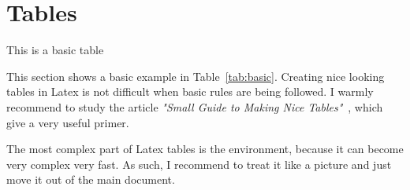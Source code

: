 \section{Tables}

\begin{table}
\centering
\caption{This is a basic table}
\label{tab:basic}

\end{table}

This section shows a basic example in Table~\ref{tab:basic}.
Creating nice looking tables in Latex is not difficult when basic rules are being followed.
I warmly recommend to study the article \emph{"Small Guide to Making Nice Tables"}~\cite{Pue08}, which give a very useful primer.

The most complex part of Latex tables is the  environment, because it can become very complex very fast.
As such, I recommend to treat it like a picture and just move it out of the main document.